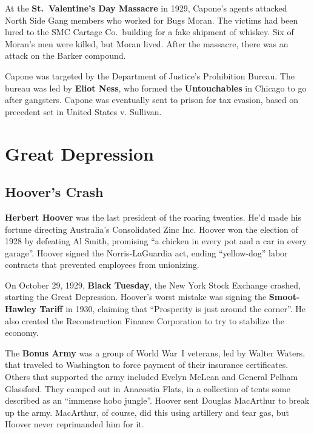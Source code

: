 At the \textbf{St.\ Valentine's Day Massacre} in 1929,
Capone's agents attacked North Side Gang members who worked for Bugs Moran.
The victims had been lured to the SMC Cartage Co.\ building for a fake shipment of whiskey.
Six of Moran's men were killed, but Moran lived.
After the massacre, there was an attack on the Barker compound.

Capone was targeted by the Department of Justice's Prohibition Bureau.
The bureau was led by \textbf{Eliot Ness}, who formed the \textbf{Untouchables} in Chicago to go after gangsters.
Capone was eventually sent to prison for tax evasion,
based on precedent set in United States v. Sullivan.

\section{Great Depression}

\subsection*{Hoover's Crash}

\textbf{Herbert Hoover} was the last president of the roaring twenties.
He'd made his fortune directing Australia's Consolidated Zinc Inc.
Hoover won the election of 1928 by defeating Al Smith,
promising ``a chicken in every pot and a car in every garage''.
Hoover signed the Norris-LaGuardia act,
ending ``yellow-dog'' labor contracts that prevented employees from unionizing.

On October 29, 1929, \textbf{Black Tuesday}, the New York Stock Exchange crashed, starting the Great Depression.
Hoover's worst mistake was signing the \textbf{Smoot-Hawley Tariff} in 1930,
claiming that ``Prosperity is just around the corner''.
He also created the Reconstruction Finance Corporation to try to stabilize the economy.

The \textbf{Bonus Army} was a group of World War~I veterans, led by Walter Waters,
that traveled to Washington to force payment of their insurance certificates.
Others that supported the army included Evelyn McLean and General Pelham Glassford.
They camped out in Anacostia Flats, in a collection of tents some described as an ``immense hobo jungle''.
Hoover sent Douglas MacArthur to break up the army.
MacArthur, of course, did this using artillery and tear gas, but Hoover never reprimanded him for it.

